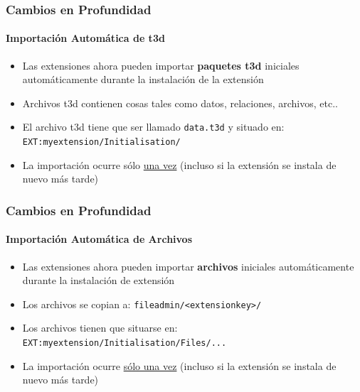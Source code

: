 
\begin{frame}[fragile]
	\frametitle{Cambios en Profundidad}
	\framesubtitle{Importación Automática de t3d}

	\begin{itemize}
		\item Las extensiones ahora pueden importar \textbf{paquetes t3d} iniciales\newline
			automáticamente durante la instalación de la extensión
		\item Archivos t3d contienen cosas tales como datos, relaciones, archivos, etc..
		\item El archivo t3d tiene que ser llamado \texttt{data.t3d} y situado en:\newline
			\texttt{EXT:myextension/Initialisation/}

		\item La importación ocurre sólo \underline{una vez}\newline
			(incluso si la extensión se instala de nuevo más tarde)

	\end{itemize}

\end{frame}


\begin{frame}[fragile]
	\frametitle{Cambios en Profundidad}
	\framesubtitle{Importación Automática de Archivos}

	\begin{itemize}
		\item Las extensiones ahora pueden importar \textbf{archivos} iniciales\newline
			automáticamente durante la instalación de extensión
		\item Los archivos se copian a:\newline
			\texttt{fileadmin/<extensionkey>/}
		\item Los archivos tienen que situarse en:\newline
			\texttt{EXT:myextension/Initialisation/Files/...}

		\item La importación ocurre \underline{sólo una vez}\newline
			(incluso si la extensión se instala de nuevo más tarde)

	\end{itemize}

\end{frame}

